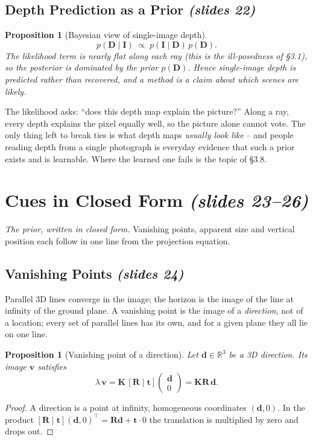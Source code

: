 \documentclass[11pt,a4paper]{article}
\numberwithin{equation}{section}
\newcommand{\slides}[1]{\texorpdfstring{\;\emph{(slides #1)}}{ (slides #1)}}
\newcommand{\R}{\mathbb{R}}
\theoremstyle{plain}
\newtheorem{proposition}[theorem]{Proposition}
\theoremstyle{definition}
\begin{document}
\subsection{Depth Prediction as a Prior \slides{22}}
 
\begin{proposition}[Bayesian view of single-image depth]\label{prop:bayes}
\[
p(\bm D\mid \bm I)\;\propto\; p(\bm I\mid \bm D)\,p(\bm D).
\]
The likelihood term is nearly flat along each ray (this is the ill-posedness of \S3.1), so the posterior is dominated by the prior $p(\bm D)$. Hence single-image depth is \emph{predicted} rather than \emph{recovered}, and a method is a claim about which scenes are likely.
\end{proposition}
 
\begin{intuition}
The likelihood asks: ``does this depth map explain the picture?'' Along a ray, every depth explains the pixel equally well, so the picture alone cannot vote. The only thing left to break ties is what depth maps \emph{usually look like} -- and people reading depth from a single photograph is everyday evidence that such a prior exists and is learnable. Where the learned one fails is the topic of \S3.8.
\end{intuition}
 
\section{Cues in Closed Form \slides{23--26}}
\emph{The prior, written in closed form.} Vanishing points, apparent size and vertical position each follow in one line from the projection equation.
 
\subsection{Vanishing Points \slides{24}}
 
Parallel 3D lines converge in the image; the horizon is the image of the line at infinity of the ground plane. A vanishing point is the image of a \emph{direction}, not of a location; every set of parallel lines has its own, and for a given plane they all lie on one line.
 
\begin{proposition}[Vanishing point of a direction]\label{prop:vp}
Let $\bm d\in\R^3$ be a 3D direction. Its image $\bm v$ satisfies
\[
\lambda\,\bm v=\bm K\,[\bm R\mid\bm t]\begin{pmatrix}\bm d\\0\end{pmatrix}=\bm K\bm R\,\bm d .
\]
\end{proposition}
\begin{proof}
A direction is a point at infinity, homogeneous coordinates $(\bm d,0)$. In the product $[\bm R\mid\bm t](\bm d,0)^\top=\bm R\bm d+\bm t\cdot0$ the translation is multiplied by zero and drops out. \qedhere
\end{proof}
 
\end{document}
